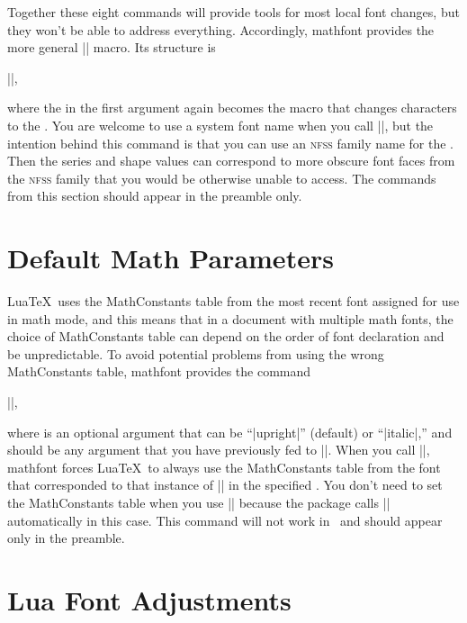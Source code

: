 \documentclass[12pt,twoside]{article}
\begin{document}
Together these eight commands will provide tools for most local font changes, but they won't be able to address everything. Accordingly, \textsf{mathfont} provides the more general |\newmathfontcommand| macro. Its structure is
\begin{code}
||,
\end{code}
where the  in the first argument again becomes the macro that changes characters to the . You are welcome to use a system font name when you call |\newmathfontcommand|, but the intention behind this command is that you can use an \textsc{nfss} family name for the . Then the series and shape values can correspond to more obscure font faces from the \textsc{nfss} family that you would be otherwise unable to access. The commands from this section should appear in the preamble only.

\section{Default Math Parameters}

Lua\TeX\ uses the MathConstants table from the most recent font assigned for use in math mode, and this means that in a document with multiple math fonts, the choice of MathConstants table can depend on the order of font declaration and be unpredictable. To avoid potential problems from using the wrong MathConstants table, \textsf{mathfont} provides the command
\begin{code}
||,
\end{code}
where  is an optional argument that can be ``|upright|'' (default) or ``|italic|,'' and  should be any argument that you have previously fed to |\mathfont|. When you call |\mathconstantsfont|, \textsf{mathfont} forces Lua\TeX\ to always use the MathConstants table from the font that corresponded to that instance of |\mathfont| in the specified . You don't need to set the MathConstants table when you use |\setfont| because the package calls |\mathconstantsfont| automatically in this case. This command will not work in \XeTeX\ and should appear only in the preamble.

\section{Lua Font Adjustments}
\end{document}
